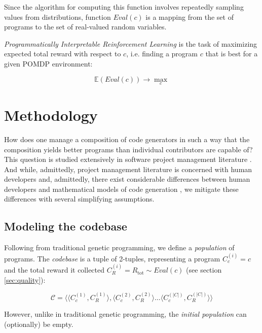 Since the algorithm for computing this function involves repeatedly sampling values from distributions, function $\mathit{Eval}(c)$ is a mapping from the set of programs to the set of real-valued random variables.

\emph{Programmatically Interpretable Reinforcement Learning} \cite{pirl} is the task of maximizing expected total reward with respect to $c$, i.e. finding a program $c$ that is best for a given POMDP environment:

\begin{equation}
    \mathbb{E}(\mathit{Eval}(c)) \longrightarrow \max_{c}
    \label{eq:pirlgoal}
\end{equation}

\section{Methodology}
\label{sec:methodology}

How does one manage a composition of code generators in such a way that the composition yields better programs than individual contributors are capable of? 
This question is studied extensively in software project management literature \cite{mythicalmanmonth}.
And while, admittedly, project management literature is concerned with human developers and, admittedly, there exist considerable differences between human developers and mathematical models of code generation \cite{bugfixing}, we mitigate these differences with several simplifying assumptions.

\subsection{Modeling the codebase}

Following from traditional genetic programming, we define a \emph{population} of programs. 
The \emph{codebase} is a tuple of 2-tuples, representing a program $C_c^{(i)}=c$ and the total reward it collected $C_R^{(i)}=R_\text{tot} \sim \mathit{Eval}(c)$ (see section \ref{sec:quality}):

\begin{equation}
    \mathcal{C} = \langle \langle C_c^{(1)}, C_R^{(1)} \rangle, \langle C_c^{(2)}, C_R^{(2)} \rangle \dots \langle C_c^{(|C|)}, C_R^{(|C|)} \rangle \rangle
\end{equation}

However, unlike in traditional genetic programming, the \emph{initial population} can (optionally) be empty.

